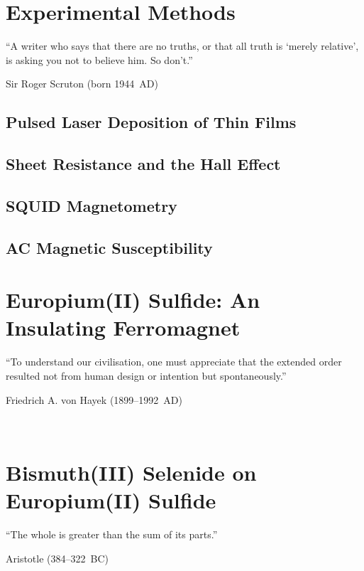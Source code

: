 ﻿\documentclass{report}
\begin{document}
\chapter{Experimental Methods}\label{ch:methods}%
\begin{refsection}   
\epigraph{``A writer who says that there are no truths, or that all truth is `merely relative', is asking you not to believe him. So don't.''}{Sir Roger Scruton (born 1944~AD)}
    \section{Pulsed Laser Deposition of Thin Films}\label{sec:pld}
		
    \section{Sheet Resistance and the Hall Effect}
		
    \section{SQUID Magnetometry}\label{sec:squid}
        
    \section{AC Magnetic Susceptibility}\label{sec:acm}
        
    \printbibliography[heading=subbibintoc, title=References for Chapter~\ref{ch:methods}]
\end{refsection} 


\chapter{Europium(II) Sulfide: An Insulating Ferromagnet}\label{ch:EuS}
\begin{refsection}
\epigraph{``To understand our civilisation, one must appreciate that the extended order resulted not from human design or intention but spontaneously.''}{Friedrich A. von Hayek (1899--1992~AD)}~\\
    
    \printbibliography[heading=subbibintoc, title=References for Chapter~\ref{ch:EuS}]
\end{refsection} 

\chapter{Bismuth(III) Selenide on Europium(II) Sulfide}\label{ch:bilayer2014}
\begin{refsection} 
\epigraph{``The whole is greater than the sum of its parts.''}{Aristotle (384--322~BC)}~\\
    
    \printbibliography[heading=subbibintoc, title=References for Chapter~\ref{ch:bilayer2014}]
\end{refsection} 
\end{document}
